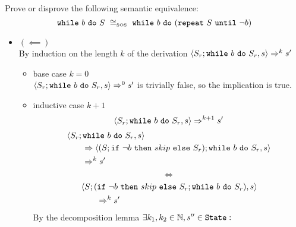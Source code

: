 \begin{exercise}{
    Prove or disprove the following semantic equivalence:
    \[ \wwhile{b}{S}\ \cong_{\text{\tiny SOS}}\ \wwhile{b}{(\wrepeat{S}{\neg b})}  \]
}
\begin{itemize}
\begin{itemize}
\begin{itemize}
\begin{itemize}
\begin{align*}
                                        \\
                                        &\instr{\wif{\neg b}{skip}{S_r}; \wwhile{b}{S_r}}{s''}
                                        \\&\qquad\Rightarrow \instr{S_r; \wwhile{b}{S_r}}{s''}
                                    \end{align*}
                                    Since $\instr{S; \wwhile{b}{S}}{s''} \Rightarrow^{k_2 - 2} s'$ and $k_2 - 2 = k - k_1 - 1 \leq k$ the inductive hypothesis holds and thus $\instr{S_r; \wwhile{b}{S_r}}{s''} \Rightarrow^* s'$
                            \end{itemize}
                    \end{itemize}
                \item $(\impliedby)$ \vspace{0.2cm} \\
                    By induction on the length $k$ of the derivation $\left<S_r; \texttt{while}\ b\ \texttt{do}\ S_r, s\right> \Rightarrow^k s'$
                    \begin{itemize}
                        \item base case $k=0$ \\
                            $\left<S_r; \texttt{while}\ b\ \texttt{do}\ S_r, s\right> \Rightarrow^0 s'$ is trivially false, so the implication is true.
                        \item inductive case $k+1$ \vspace*{-0.3cm}
                        \[ \left<S_r; \texttt{while}\ b\ \texttt{do}\ S_r, s\right> \Rightarrow^{k+1} s' \]
                        \begin{align*}
                            &\left<S_r; \texttt{while}\ b\ \texttt{do}\ S_r, s\right>
                            \\&\qquad\Rightarrow \left<(S; \texttt{if}\ \neg b\ \texttt{then}\ skip\ \texttt{else}\ S_r); \texttt{while}\ b\ \texttt{do}\ S_r, s\right>
                            \\&\qquad\Rightarrow^{k} s'
                        \end{align*}
                        \[ \iff \]
                        \begin{align*}
                            &\left<S; (\texttt{if}\ \neg b\ \texttt{then}\ skip\ \texttt{else}\ S_r; \texttt{while}\ b\ \texttt{do}\ S_r), s\right>
                            \\&\qquad\Rightarrow^{k} s'
                        \end{align*}
                        By the decomposition lemma $\exists k_1, k_2 \in \mathbb{N}, s'' \in \texttt{State} :$
                        \begin{gather*}

\end{gather*}
\end{itemize}
\end{itemize}
\end{itemize}
\end{exercise}

